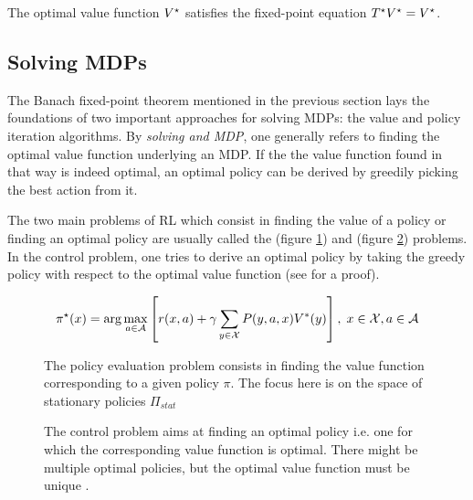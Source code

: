 The optimal value function $V^\star$ satisfies the fixed-point equation
$T^\star V^\star = V^\star$.

\subsection{Solving MDPs}

The Banach fixed-point theorem mentioned in the previous section lays the foundations of
two important approaches for solving MDPs: the value and policy iteration algorithms. By
\textit{solving and MDP}, one generally refers to finding the optimal value function
underlying an MDP. If the the value function found in that way is indeed optimal, an
optimal policy can be derived by greedily picking the best action from it.

The two main problems of RL which consist in finding the value of a policy or finding an optimal policy are usually called the  (figure \ref{fig:prediction-problem}) and  (figure \ref{fig:control-problem}) problems. In the control
problem, one tries to derive an optimal policy by taking the greedy policy with
respect to the optimal value function (see \cite{Ross1983} for a proof).

\begin{equation}
\pi^\star(x) = \arg \max_{a \in \mathcal{A}} \left[ r(x,a) + \gamma \sum_{y \in
\mathcal{X}} P(y, a, x) V^*(y)\right], \; x \in
\mathcal{X}, a \in \mathcal{A} \label{eq:greedy-optimal-policy}
\end{equation}

\begin{figure}
\centering

\caption{The policy evaluation problem consists in finding the value function
corresponding to a given policy $\pi$. The focus here is on the space of 
stationary policies $\Pi_{stat}$}
\label{fig:prediction-problem}
\end{figure}

\begin{figure}
\centering

\caption{The control problem aims at finding an optimal policy i.e. one for which the
corresponding value function is optimal. There might be multiple optimal policies, but
the optimal value function must be unique \parencite{Ross1983}.}
\label{fig:control-problem}
\end{figure}

